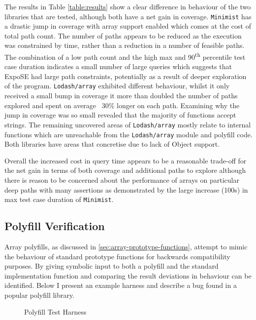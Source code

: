 \documentclass[]{final_report}
\begin{document}
The results in Table \ref{table:results} show a clear difference in behaviour of the two libraries that are tested, although both have a net gain in coverage. \lstinline|Minimist| has a drastic jump in coverage with array support enabled which comes at the cost of total path count. The number of paths appears to be reduced as the execution was constrained by time, rather than a reduction in a number of feasible paths. The combination of a low path count and the high max and 90\textsuperscript{th} percentile test case duration indicates a small number of large queries which suggests that ExpoSE had large path constraints, potentially as a result of deeper exploration of the program. \lstinline|Lodash/array| exhibited different behaviour, whilst it only received a small bump in coverage it more than doubled the number of paths explored and spent on average ~30\% longer on each path. Examining why the jump in coverage was so small revealed that the majority of functions accept strings. The remaining uncovered areas of \lstinline|Lodash/array| mostly relate to internal functions which are unreachable from the \lstinline|Lodash/array| module and polyfill code. Both libraries have areas that concretise due to lack of Object support.

Overall the increased cost in query time appears to be a reasonable trade-off for the net gain in terms of both coverage and additional paths to explore although there is reason to be concerned about the performance of arrays on particular deep paths with many assertions as demonstrated by the large increase (100s) in max test case duration of \lstinline|Minimist|.

\subsection{Polyfill Verification}
Array polyfills, as discussed in \ref{sec:array-prototype-functions}, attempt to mimic the behaviour of standard prototype functions for backwards compatibility purposes. By giving symbolic input to both a polyfill and the standard implementation function and comparing the result deviations in behaviour can be identified. Below I present an example harness and describe a bug found in a popular polyfill library.

\begin{figure}[t]

\caption{\label{fig:polyfill-test-harness} Polyfill Test Harness}
\end{figure}
\end{document}
